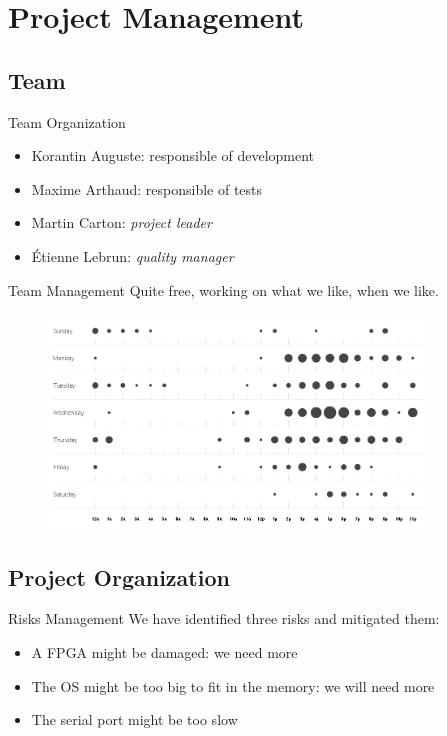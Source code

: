 \documentclass{beamer}
\begin{document}
  \section{Project Management}
    \subsection{Team}
      \begin{frame}{Team Organization}
        \begin{itemize}
          \item Korantin Auguste: responsible of development
          \item Maxime Arthaud: responsible of tests
          \item Martin Carton: \textit{project leader}
          \item Étienne Lebrun: \textit{quality manager}
        \end{itemize}
      \end{frame}

      \begin{frame}{Team Management}
        Quite free, working on what we like, when we like.

        \pause
        \begin{figure}
          \centering
          \includegraphics[width=0.9\textwidth]{fig/punchcard.png}
        \end{figure}
      \end{frame}

    \subsection{Project Organization}
      \begin{frame}{Risks Management}
        We have identified three risks and mitigated them:
        \begin{itemize}
          \item A FPGA might be damaged: we need more
          \item The OS might be too big to fit in the memory: we will need more
          \item The serial port might be too slow
        \end{itemize}
      \end{frame}
\end{document}
